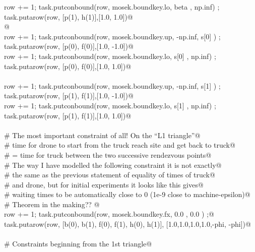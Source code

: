 \documentclass[11.5pt]{report}
\begin{document}
\begin{flushleft}
\begin{list}{}{}
\mbox{}\verb@            row += 1; task.putconbound(row, mosek.boundkey.lo, beta  , np.inf) ; task.putarow(row, [p(1), h(1)],[1.0,  1.0])@\\
\mbox{}\verb@            @\\
\mbox{}\verb@            row += 1; task.putconbound(row, mosek.boundkey.up, -np.inf, s[0]  ) ; task.putarow(row, [p(0), f(0)],[1.0, -1.0])@\\
\mbox{}\verb@            row += 1; task.putconbound(row, mosek.boundkey.lo,  s[0]  , np.inf) ; task.putarow(row, [p(0), f(0)],[1.0,  1.0])@\\
\mbox{}\verb@@\\
\mbox{}\verb@            row += 1; task.putconbound(row, mosek.boundkey.up, -np.inf, s[1]  ) ; task.putarow(row, [p(1), f(1)],[1.0, -1.0])@\\
\mbox{}\verb@            row += 1; task.putconbound(row, mosek.boundkey.lo,  s[1]  , np.inf) ; task.putarow(row, [p(1), f(1)],[1.0,  1.0])@\\
\mbox{}\verb@@\\
\mbox{}\verb@            # The most important constraint of all! On the ``L1 triangle''@\\
\mbox{}\verb@            # time for drone to start from the truck reach site and get back to truck@\\
\mbox{}\verb@            # = time for truck between the two successive rendezvous points@\\
\mbox{}\verb@            # The way I have modelled the following constraint it is not exactly@\\
\mbox{}\verb@            # the same as the previous statement of equality of times of truck@\\
\mbox{}\verb@            # and drone, but for initial experiments it looks like this gives@\\
\mbox{}\verb@            # waiting times to be automatically close to 0 (1e-9 close to machine-epsilon)@\\
\mbox{}\verb@            # Theorem in the making?? @\\
\mbox{}\verb@            row += 1; task.putconbound(row, mosek.boundkey.fx, 0.0 , 0.0 ) ;@\\
\mbox{}\verb@            task.putarow(row, [b(0), b(1), f(0), f(1), h(0), h(1)], [1.0,1.0,1.0,1.0,-phi, -phi])@\\
\mbox{}\verb@@\\
\mbox{}\verb@            # Constraints beginning from the 1st triangle@\\

\end{list}
\end{flushleft}
\end{document}
